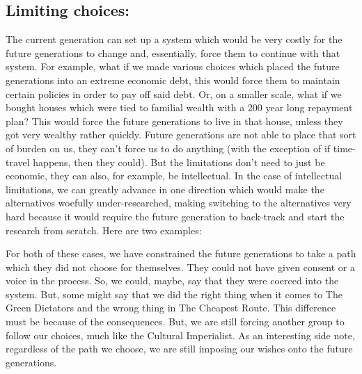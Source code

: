 \subsection{Limiting choices:}

The current generation can set up a system which would be very costly for the future generations to change and, essentially, force them to continue with that system. For example, what if we made various choices which placed the future generations into an extreme economic debt, this would force them to maintain certain policies in order to pay off said debt. Or, on a smaller scale, what if we bought houses which were tied to familial wealth with a 200 year long repayment plan? This would force the future generations to live in that house, unless they got very wealthy rather quickly. Future generations are not able to place that sort of burden on us, they can't force us to do anything (with the exception of if time-travel happens, then they could). But the limitations don't need to just be economic, they can also, for example, be intellectual. In the case of intellectual limitations, we can greatly advance in one direction which would make the alternatives woefully under-researched, making switching to the alternatives very hard because it would require the future generation to back-track and start the research from scratch. Here are two examples: 





For both of these cases, we have constrained the future generations to take a path which they did not choose for themselves. They could not have given consent or a voice in the process. So, we could, maybe, say that they were coerced into the system. But, some might say that we did the right thing when it comes to The Green Dictators and the wrong thing in The Cheapest Route. This difference must be because of the consequences. But, we are still forcing another group to follow our choices, much like the Cultural Imperialist. As an interesting side note, regardless of the path we choose, we are still imposing our wishes onto the future generations.
